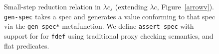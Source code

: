 \begin{figure}
\caption{Small-step reduction relation in $\lambda c_s$ (extending $\lambda c$, Figure~\ref{arrowv}).
  \texttt{gen-spec} takes a spec and generates a value conforming to that spec
  via the \texttt{gen-spec*} metafunction.
  We define \texttt{assert-spec} with support for 
for \texttt{fdef} using traditional proxy checking semantics, and flat predicates.}
  \label{arrowvspec}
\end{figure}

